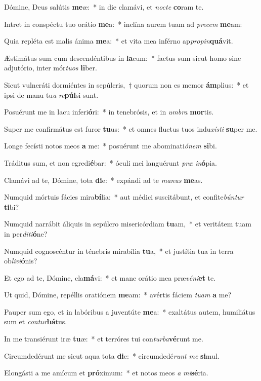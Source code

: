 \item Dómine, Deus salútis \textbf{me}æ:~* in die clamávi, et \textit{noc}\textit{te} \textbf{co}ram te.
\item Intret in conspéctu tuo orátio \textbf{me}a:~* inclína aurem tuam ad \textit{pre}\textit{cem} \textbf{me}am:
\item Quia repléta est malis ánima \textbf{me}a:~* et vita mea inférno ap\textit{pro}\textit{pin}\textbf{quá}vit.
\item Æstimátus sum cum descendéntibus in \textbf{la}cum:~* factus sum sicut homo sine adjutório, inter mór\textit{tu}\textit{os} \textbf{li}ber.
\item Sicut vulneráti dormiéntes in sepúlcris,~† quorum non es memor \textbf{ám}plius:~* et ipsi de manu tu\textit{a} \textit{re}\textbf{púl}si sunt.
\item Posuérunt me in lacu inferi\textbf{ó}ri:~* in tenebrósis, et in \textit{um}\textit{bra} \textbf{mor}tis.
\item Super me confirmátus est furor \textbf{tu}us:~* et omnes fluctus tuos indu\textit{xís}\textit{ti} \textbf{su}per me.
\item Longe fecísti notos meos \textbf{a} me:~* posuérunt me abominati\textit{ó}\textit{nem} \textbf{si}bi.
\item Tráditus sum, et non egredi\textbf{é}bar:~* óculi mei languérunt \textit{præ} \textit{in}\textbf{ó}pia.
\item Clamávi ad te, Dómine, tota \textbf{di}e:~* expándi ad te \textit{ma}\textit{nus} \textbf{me}as.
\item Numquid mórtuis fácies mira\textbf{bí}lia:~* aut médici suscitábunt, et confite\textit{bún}\textit{tur} \textbf{ti}bi?
\item Numquid narrábit áliquis in sepúlcro misericórdiam \textbf{tu}am,~* et veritátem tuam in per\textit{di}\textit{ti}\textbf{ó}ne?
\item Numquid cognoscéntur in ténebris mirabília \textbf{tu}a,~* et justítia tua in terra ob\textit{li}\textit{vi}\textbf{ó}nis?
\item Et ego ad te, Dómine, cla\textbf{má}vi:~* et mane orátio mea præ\textit{vé}\textit{ni}\textbf{et} te.
\item Ut quid, Dómine, repéllis oratiónem \textbf{me}am:~* avértis fáciem \textit{tu}\textit{am} \textbf{a} me?
\item Pauper sum ego, et in labóribus a juventúte \textbf{me}a:~* exaltátus autem, humiliátus sum et \textit{con}\textit{tur}\textbf{bá}tus.
\item In me transiérunt iræ \textbf{tu}æ:~* et terróres tui con\textit{tur}\textit{ba}\textbf{vé}runt me.
\item Circumdedérunt me sicut aqua tota \textbf{di}e:~* circumdedé\textit{runt} \textit{me} \textbf{si}mul.
\item Elongásti a me amícum et \textbf{pró}ximum:~* et notos meos \textit{a} \textit{mi}\textbf{sé}ria.
